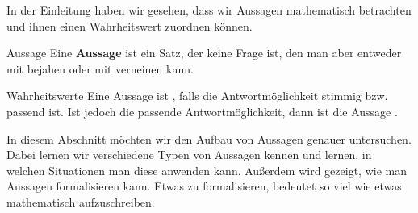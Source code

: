 \documentclass[../../main.tex]{subfiles}
\begin{document}
\newcommand{\statementIcon}[3]{
    \begin{tikzpicture}[onbase]
        \node at (0,0) {\texttt{[image: \#1]}};
        \ifthenelse{\equal{#3}{}}{}{
            \draw[line width=2mm,red,opacity=0.6] (-.5,-.5) -- (.5,.5);
            \draw[line width=2mm,red,opacity=0.6] (.5,-.5) -- (-.5,.5);
        }
    \end{tikzpicture}
}
\def\poisonIcn{\statementIcon{images/poison.png}{0.86}{}}
\def\superPwrIcn{\statementIcon{images/super_power.png}{0.86}{}}
\def\superPwrIcnVarI{\statementIcon{images/super_power_index1.png}{0.86}{}}
\def\superPwrIcnVarII{\statementIcon{images/super_power_index2.png}{0.86}{}}
\def\drinkIcn{\statementIcon{images/trinken_TEMP.png}{0.86}{}}
\def\burgerIcn{\statementIcon{images/burger.png}{1.53}{}}
\def\saladIcn{\statementIcon{images/salat.png}{1.39}{}}
\def\friesIcn{\statementIcon{images/pommes.png}{0.86}{}}

In der Einleitung haben wir gesehen, dass wir Aussagen mathematisch betrachten und ihnen einen
Wahrheitswert zuordnen können.

\begin{definition}{Aussage}
    Eine \textbf{Aussage} ist ein Satz, der keine Frage ist, den man aber entweder mit 
     bejahen oder mit  
    verneinen kann.
\end{definition}

\begin{definition}{Wahrheitswerte}
    Eine Aussage ist \wahr, falls die Antwortmöglichkeit 
    stimmig bzw. passend ist. Ist jedoch  die passende
    Antwortmöglichkeit, dann ist die Aussage \falsch.
\end{definition}

In diesem Abschnitt möchten wir den Aufbau von Aussagen genauer untersuchen. 
Dabei lernen wir verschiedene Typen von Aussagen kennen und lernen, 
in welchen Situationen man diese anwenden kann. Außerdem wird gezeigt, 
wie man Aussagen formalisieren kann. Etwas zu formalisieren, bedeutet so 
viel wie etwas mathematisch aufzuschreiben.
\end{document}
